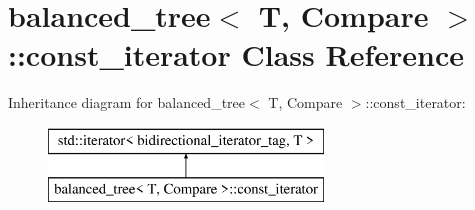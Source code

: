 \hypertarget{classbalanced__tree_1_1const__iterator}{\section{balanced\+\_\+tree$<$ T, Compare $>$\+:\+:const\+\_\+iterator Class Reference}
\label{classbalanced__tree_1_1const__iterator}
}
Inheritance diagram for balanced\+\_\+tree$<$ T, Compare $>$\+:\+:const\+\_\+iterator\+:\begin{figure}[H]
\begin{center}
\leavevmode
\includegraphics[height=2.000000cm]{classbalanced__tree_1_1const__iterator}
\end{center}
\end{figure}
